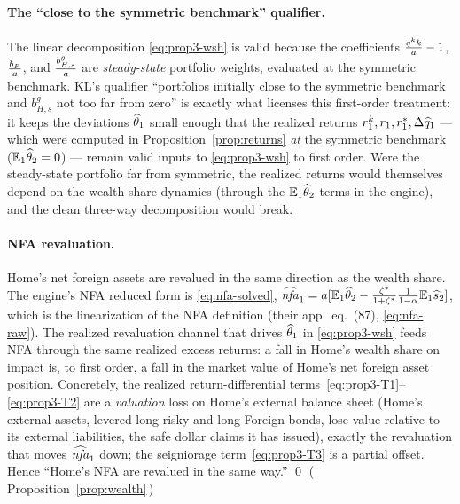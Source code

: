 \paragraph{The ``close to the symmetric benchmark'' qualifier.} The linear
decomposition \eqref{eq:prop3-wsh} is valid because the coefficients
$\frac{q^{k} k}{a}-1$, $\frac{b_F}{a}$, and $\frac{b^g_{H,s}}{a}$ are
\emph{steady-state} portfolio weights, evaluated at the symmetric benchmark. KL's
qualifier ``portfolios initially close to the symmetric benchmark and $b^g_{H,s}$
not too far from zero'' is exactly what licenses this first-order treatment: it
keeps the deviations $\widehat{\theta}_1$ small enough that the realized returns
$r^{k}_1,r_1,r^{*}_1,\Delta\widehat{q}_1$ --- which were computed in
Proposition~\ref{prop:returns} \emph{at} the symmetric benchmark
($\mathbb{E}_1\widehat{\theta}_2=0$) --- remain valid inputs to \eqref{eq:prop3-wsh} to first
order. Were the steady-state portfolio far from symmetric, the realized returns
would themselves depend on the wealth-share dynamics (through the
$\mathbb{E}_1\widehat{\theta}_2$ terms in the engine), and the clean three-way decomposition
would break.

\paragraph{NFA revaluation.} Home's net foreign assets are revalued in the same
direction as the wealth share. The engine's NFA reduced form is
\eqref{eq:nfa-solved}, $\widehat{\mathit{nfa}}_1=a[\mathbb{E}_1\widehat{\theta}_2-\frac{\zeta^{*}}{1+\zeta^{*}}\frac{1}{1-\alpha}\mathbb{E}_1\widehat{s}_2]$,
which is the linearization of the NFA definition (their app.~eq.~(87),
\eqref{eq:nfa-raw}). The realized revaluation channel that drives $\widehat{\theta}_1$
in \eqref{eq:prop3-wsh} feeds NFA through the same realized excess returns: a
fall in Home's wealth share on impact is, to first order, a fall in the market
value of Home's net foreign asset position. Concretely, the realized
return-differential terms~\eqref{eq:prop3-T1}--\eqref{eq:prop3-T2} are a
\emph{valuation} loss on Home's external balance sheet (Home's external assets,
levered long risky and long Foreign bonds, lose value relative to its external
liabilities, the safe dollar claims it has issued), exactly the revaluation that
moves $\widehat{\mathit{nfa}}_1$ down; the seigniorage term~\eqref{eq:prop3-T3} is a
partial offset. Hence ``Home's NFA are revalued in the same way.'' \qed
(\,Proposition~\ref{prop:wealth}\,)

